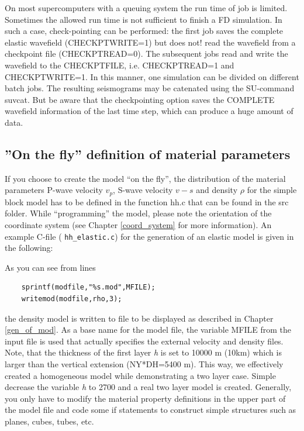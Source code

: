 \documentclass[11pt,onecolumn,oneside]{article}
\begin{document}
On most supercomputers with a queuing system the run time of job is limited. Sometimes the allowed run time is not sufficient to finish a FD simulation. In such a case, check-pointing can be performed: the first job saves the complete elastic wavefield (CHECKPTWRITE=1) but does not! read the wavefield from a checkpoint file (CHECKPTREAD=0). The subsequent jobs read and write the wavefield to the CHECKPTFILE, i.e. CHECKPTREAD=1 and CHECKPTWRITE=1. In this manner, one simulation can be divided on different batch jobs. The resulting seismograms may be catenated using the SU-command suvcat. But be aware that the checkpointing option saves the COMPLETE wavefield information of the last time step, which can produce a huge amount of data.

\subsection{''On the fly'' definition of material parameters}
\label{model_def_func}
If you choose to create the model ``on the fly'', the distribution of the material parameters P-wave velocity $v_p$, S-wave velocity $v-s$ and density $\rho$ for the simple block model has to be defined in the function hh.c that can be found in the src folder. While ``programming'' the model, please note the orientation of the coordinate system (see Chapter \ref{coord_system} for more information). An example C-file ( \lstinline{hh_elastic.c}) for the generation of an elastic model is given in the following:




As you can see from lines
\begin{verbatim}
    sprintf(modfile,"%s.mod",MFILE);
    writemod(modfile,rho,3);
\end{verbatim}
the density model is written to file to be displayed as described in Chapter \ref{gen_of_mod}. As a base name for the model file, the variable MFILE from the input file is used that actually specifies the external velocity and density files. Note, that the thickness of the first layer \textit{h} is set to 10000 m (10km) which is larger than the vertical extension (NY*DH=5400 m). This way, we effectively created a homogeneous model while demonstrating a two layer case. Simple decrease the variable \textit{h} to 2700 and a real two layer model is created. Generally, you only have to modify the material property definitions in the upper part of the model file and code some if statements to construct simple structures such as planes, cubes, tubes, etc.
\end{document}

